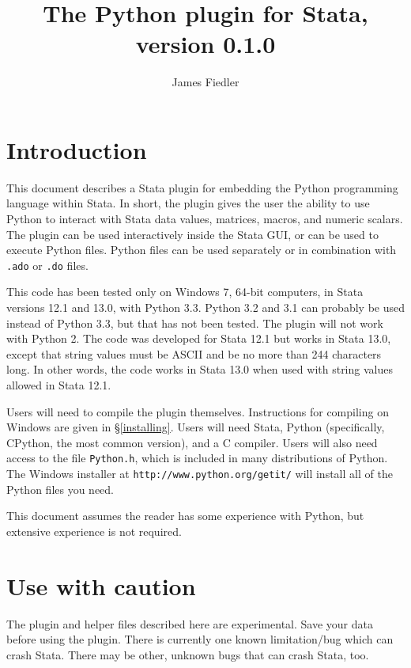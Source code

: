 \documentclass{article}
\title{The Python plugin for Stata, version 0.1.0}
\author{James Fiedler}
\begin{document}
\maketitle
\tableofcontents

	\section{Introduction}
		
		This document describes a Stata plugin for embedding the Python programming language within Stata. In short, the plugin gives the user the ability to use Python to interact with Stata data values, matrices, macros, and numeric scalars. The plugin can be used interactively inside the Stata GUI, or can be used to execute Python files. Python files can be used separately or in combination with \lstinline{.ado} or \lstinline{.do} files.
		
		This code has been tested only on Windows 7, 64-bit computers, in Stata versions 12.1 and 13.0, with Python 3.3. Python 3.2 and 3.1 can probably be used instead of Python 3.3, but that has not been tested. The plugin will not work with Python 2. The code was developed for Stata 12.1 but works in Stata 13.0, except that string values must be \textsc{ASCII} and be no more than 244 characters long. In other words, the code works in Stata 13.0 when used with string values allowed in Stata 12.1.
		
		Users will need to compile the plugin themselves. Instructions for compiling on Windows are given in \S\ref{installing}. Users will need Stata, Python (specifically, CPython, the most common version), and a C compiler. Users will also need access to the file \lstinline{Python.h}, which is included in many distributions of Python. The Windows installer at \lstinline{http://www.python.org/getit/} will install all of the Python files you need. 
		
		This document assumes the reader has some experience with Python, but extensive experience is not required.
				

	\section{Use with caution}
	
	The plugin and helper files described here are experimental. Save your data before using the plugin. There is currently one known limitation/bug which can crash Stata. There may be other, unknown bugs that can crash Stata, too.
	
\end{document}
